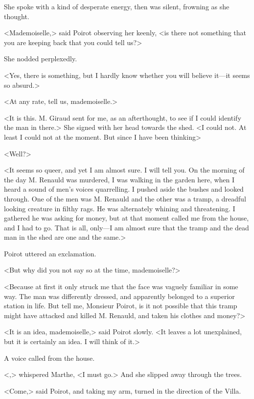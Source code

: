  She spoke with a kind of desperate energy, then was silent, frowning as she thought. 

 <Mademoiselle,> said Poirot observing her keenly, <is there not something that you are keeping back that you could tell us?> 

 She nodded perplexedly. 

 <Yes, there is something, but I hardly know whether you will believe it—it seems so absurd.> 

 <At any rate, tell us, mademoiselle.> 

 <It is this. M. Giraud sent for me, as an afterthought, to see if I could identify the man in there.> She signed with her head towards the shed. <I could not. At least I could not at the moment. But since I have been thinking\longdash> 

 <Well?> 

 <It seems so queer, and yet I am almost sure. I will tell you. On the morning of the day M. Renauld was murdered, I was walking in the garden here, when I heard a sound of men's voices quarrelling. I pushed aside the bushes and looked through. One of the men was M. Renauld and the other was a tramp, a dreadful looking creature in filthy rags. He was alternately whining and threatening. I gathered he was asking for money, but at that moment  called me from the house, and I had to go. That is all, only—I am almost sure that the tramp and the dead man in the shed are one and the same.> 

 Poirot uttered an exclamation. 

 <But why did you not say so at the time, mademoiselle?> 

 <Because at first it only struck me that the face was vaguely familiar in some way. The man was differently dressed, and apparently belonged to a superior station in life. But tell me, Monsieur Poirot, is it not possible that this tramp might have attacked and killed M. Renauld, and taken his clothes and money?> 

 <It is an idea, mademoiselle,> said Poirot slowly. <It leaves a lot unexplained, but it is certainly an idea. I will think of it.> 

 A voice called from the house. 

 <,> whispered Marthe, <I must go.> And she slipped away through the trees. 

 <Come,> said Poirot, and taking my arm, turned in the direction of the Villa. 


